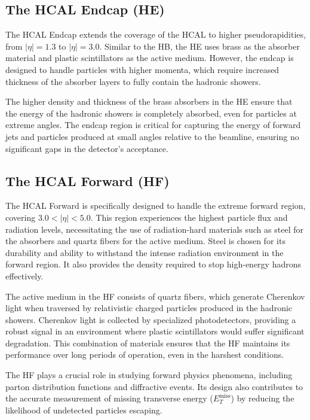 \subsection{The HCAL Endcap (HE)}
The HCAL Endcap extends the coverage of the HCAL to higher pseudorapidities, from $|\eta| = 1.3$ to $|\eta| = 3.0$. Similar to the HB, the HE uses brass as the absorber material and plastic scintillators as the active medium. However, the endcap is designed to handle particles with higher momenta, which require increased thickness of the absorber layers to fully contain the hadronic showers.

The higher density and thickness of the brass absorbers in the HE ensure that the energy of the hadronic showers is completely absorbed, even for particles at extreme angles. The endcap region is critical for capturing the energy of forward jets and particles produced at small angles relative to the beamline, ensuring no significant gaps in the detector's acceptance.~\cite{hcal_tdr}

\subsection{The HCAL Forward (HF)}
The HCAL Forward is specifically designed to handle the extreme forward region, covering $3.0 < |\eta| < 5.0$. This region experiences the highest particle flux and radiation levels, necessitating the use of radiation-hard materials such as steel for the absorbers and quartz fibers for the active medium. Steel is chosen for its durability and ability to withstand the intense radiation environment in the forward region. It also provides the density required to stop high-energy hadrons effectively.

The active medium in the HF consists of quartz fibers, which generate Cherenkov light when traversed by relativistic charged particles produced in the hadronic showers. Cherenkov light is collected by specialized photodetectors, providing a robust signal in an environment where plastic scintillators would suffer significant degradation. This combination of materials ensures that the HF maintains its performance over long periods of operation, even in the harshest conditions.

The HF plays a crucial role in studying forward physics phenomena, including parton distribution functions and diffractive events. Its design also contributes to the accurate measurement of missing transverse energy ($E_T^{\text{miss}}$) by reducing the likelihood of undetected particles escaping.~\cite{hcal_tdr_forward}

